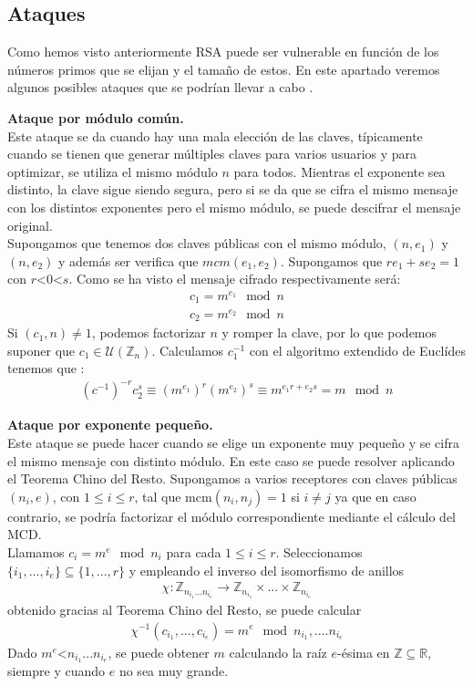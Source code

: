 \subsection{Ataques}
Como hemos visto anteriormente RSA puede ser vulnerable en función de los números primos que se elijan y el tamaño de estos. En este apartado veremos algunos posibles ataques que se podrían llevar a cabo \cite{GomezPardo2002b}.
\begin{description}
	\item \textbf{Ataque por módulo común.}\\
	Este ataque se da cuando hay una mala elección de las claves, típicamente cuando se tienen que generar múltiples claves para varios usuarios y para optimizar, se utiliza el mismo módulo $n$ para todos. Mientras el exponente sea distinto, la clave sigue siendo segura, pero si se da que se cifra el mismo mensaje con los distintos exponentes pero el mismo módulo, se puede descifrar el mensaje original.\\
	Supongamos que tenemos dos claves públicas con el mismo módulo, $(n, e_1)$ y $(n, e_2)$ y además ser verifica que  $mcm(e_1,e_2)$. Supongamos que $re_1+se_2=1$ con $r$\textless $0$\textless $s$. Como se ha visto el mensaje cifrado respectivamente será:
	\begin{align*}
		c_1 = m^{e_1} \mod n\\
		c_2 = m^{e_2} \mod n
	\end{align*}
	Si $(c_1,n) \neq 1$, podemos factorizar $n$ y romper la clave, por lo que podemos suponer que $c_1 \in \mathcal{U}(\mathbb{Z}_n)$. Calculamos $c_1^{-1}$ con el algoritmo extendido de Euclídes tenemos que :
	\begin{align*}
			(c^{-1})^{-r}c_2^s \equiv (m^{e_1})^r(m^{e_2})^s \equiv m^{e_1r+e_2s} = m \mod n
	\end{align*}

	\item \textbf{Ataque por exponente pequeño.}\\
	Este ataque se puede hacer cuando se elige un exponente muy pequeño y se cifra el mismo mensaje con distinto módulo. En este caso se puede resolver aplicando el Teorema Chino del Resto. Supongamos a varios receptores con claves públicas $(n_i, e)$, con $1\leq i \leq r$, tal que mcm$(n_i, n_j) = 1$ si $i\neq j$ ya que en caso contrario, se podría factorizar el módulo correspondiente mediante el cálculo del MCD.\\
	Llamamos $c_i = m^e \mod n_i$ para cada $1\leq i \leq r$. Seleccionamos $\{i_1,...,i_e \}\subseteq \{1,...,r\}$ y empleando el inverso del isomorfismo de anillos
	\begin{align*}
		\chi:\mathbb{Z}_{n_{i_1}...n_{i_e}}\rightarrow \mathbb{Z}_{n_{i_1}}\times ... \times \mathbb{Z}_{n_{i_e}}
	\end{align*}
	obtenido gracias al Teorema Chino del Resto, se puede calcular
	\begin{align*}
		\chi^{-1}(c_{i_1},...,c_{i_e}) = m^e \mod n_{i_1},....n_{i_e}
	\end{align*}
	Dado $m^e$\textless $n_{i_1}...n_{i_e}$, se puede obtener $m$ calculando la raíz $e$-ésima en $\mathbb{Z} \subseteq \mathbb{R}$, siempre y cuando $e$ no sea muy grande.


\end{description}
